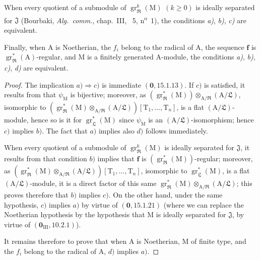 \begin{theorem}[19.7.1]
When every quotient of a submodule of $\operatorname{gr}_\mathfrak{R}^k(\mathrm{M})$ $(k\geqslant 0)$ is ideally separated for $\mathfrak{J}$ (Bourbaki, \emph{Alg.~comm.}, chap.~III, \textsection~5, n\textsuperscript{o}~1), the conditions \emph{a)}, \emph{b)}, \emph{c)} are equivalent.

Finally, when $\mathrm{A}$ is Noetherian, the $f_i$ belong to the radical of $\mathrm{A}$, the sequence $\mathbf{f}$ is $\operatorname{gr}_\mathfrak{R}^*(\mathrm{A})$-regular, and $\mathrm{M}$ is a finitely generated $\mathrm{A}$-module, the conditions \emph{a)}, \emph{b)}, \emph{c)}, \emph{d)} are equivalent.
\end{theorem}

\begin{proof}
The implication $a)\Rightarrow c)$ is immediate $(\mathbf{0},15.1.13)$. If $c)$ is satisfied, it results from  that $\psi_\mathrm{M}$ is bijective; moreover, as $(\operatorname{gr}_\mathfrak{R}^*(\mathrm{M}))\otimes_{\mathrm{A}/\mathfrak{R}}(\mathrm{A}/\mathfrak{L})$, isomorphic to $(\operatorname{gr}_\mathfrak{R}^*(\mathrm{M})\otimes_{\mathrm{A}/\mathfrak{R}}(\mathrm{A}/\mathfrak{L}))[\mathrm{T}_1,\ldots,\mathrm{T}_n]$, is a flat $(\mathrm{A}/\mathfrak{L})$-module, hence so is it for $\operatorname{gr}_\mathfrak{L}^*(\mathrm{M})$ since $\psi_\mathrm{M}$ is an $(\mathrm{A}/\mathfrak{L})$-isomorphism; hence $c)$ implies $b)$. The fact that $a)$ implies also $d)$ follows immediately.

When every quotient of a submodule of $\operatorname{gr}_\mathfrak{R}^k(\mathrm{M})$ is ideally separated for $\mathfrak{J}$, it results from  that condition $b)$ implies that $\mathbf{f}$ is $(\operatorname{gr}_\mathfrak{R}^*(\mathrm{M}))$-regular; moreover, as $(\operatorname{gr}_\mathfrak{R}^*(\mathrm{M})\otimes_{\mathrm{A}/\mathfrak{R}}(\mathrm{A}/\mathfrak{L}))[\mathrm{T}_1,\ldots,\mathrm{T}_n]$, isomorphic to $\operatorname{gr}_\mathfrak{L}^*(\mathrm{M})$, is a flat $(\mathrm{A}/\mathfrak{L})$-module, it is a direct factor of this same $\operatorname{gr}_\mathfrak{R}^*(\mathrm{M})\otimes_{\mathrm{A}/\mathfrak{R}}(\mathrm{A}/\mathfrak{L})$; this proves therefore that $b)$ implies $c)$. On the other hand, under the same hypothesis, $c)$ implies $a)$ by virtue of $(\mathbf{0},15.1.21)$ (where we can replace the Noetherian hypothesis by the hypothesis that $\mathrm{M}$ is ideally separated for $\mathfrak{J}$, by virtue of $(\mathbf{0}_\mathrm{III},10.2.1)$).

It remains therefore to prove that when $\mathrm{A}$ is Noetherian, $\mathrm{M}$ of finite type, and the $f_i$ belong to the radical of $\mathrm{A}$, $d)$ implies $a)$.


\end{proof}
